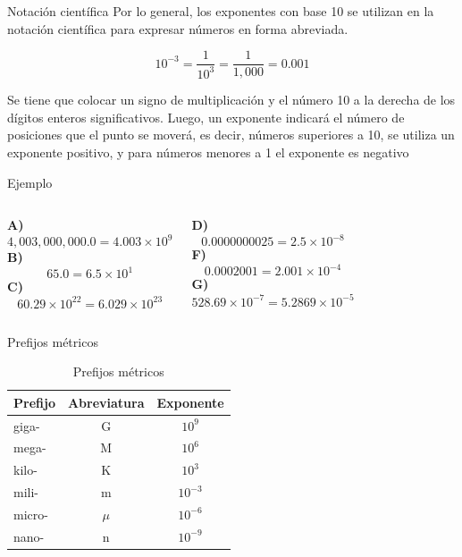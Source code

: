 \documentclass[12pt, aspectratio=169]{beamer}
\newcommand{\col}{\column{0.5\textwidth}}
\begin{document}
\begin{frame}{Notaci\'on cient\'ifica}
	Por lo general, los exponentes con base 10 se utilizan en la notaci\'on cient\'ifica para expresar n\'umeros en forma abreviada.
	
	$$10^{-3} = \frac{1}{10^3} = \frac{1}{1,000} = 0.001$$
	
\end{frame}

\begin{frame}
	
	Se tiene que colocar un signo de multiplicaci\'on y el n\'umero 10 a la derecha de los d\'igitos enteros significativos. Luego, un exponente indicar\'a el n\'umero de posiciones que el punto se mover\'a, es decir, n\'umeros superiores a 10, se utiliza un exponente positivo, y para n\'umeros menores a 1 el exponente es negativo	
\end{frame}

\begin{frame}[t]{Ejemplo}
	\begin{columns}
		\col
		\textbf{A)}
		$$4,003,000,000.0 = 4.003 \times 10^9 $$
		\textbf{B)}
		$$65.0 = 6.5 \times 10^1$$
		\textbf{C)}
		$$60.29 \times 10^{22} = 6.029 \times 10^{23}$$
				
		\col
		\textbf{D)}
		$$0.0000000025 = 2.5 \times 10^{-8}$$
		\textbf{F)}
		$$0.0002001 = 2.001 \times 10^{-4}$$
		\textbf{G)}
		$$528.69 \times 10^{-7} = 5.2869 \times 10^{-5}$$
				
	\end{columns}
	
\end{frame}

\begin{frame}{Prefijos m\'etricos} %
	
	\begin{table}
		\caption{Prefijos m\'etricos}
		\begin{tabular}{lcc}
			\hline
			Prefijo & Abreviatura & Exponente \\
			\hline
			giga- & G & $10^9$ \\
			mega- & M & $10^6$ \\
			kilo- & K & $10^3$ \\
			mili- & m  & $10^{-3}$ \\
			micro- & $\mu$  & $10^{-6}$ \\
			nano- & n & $10^{-9}$ \\
			\hline
		\end{tabular}
	\end{table}
	
\end{frame}
\end{document}
